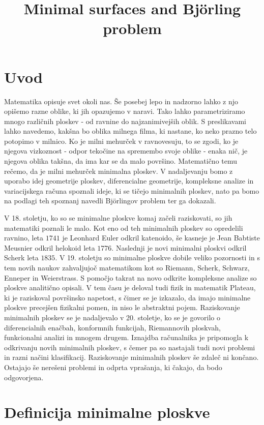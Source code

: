 \documentclass[mat1]{fmfdelo}
\title{Minimal surfaces and Björling problem}
\begin{document}
\section{Uvod}

Matematika opisuje svet okoli nas. Še posebej lepo in nadzorno lahko z njo opišemo razne oblike, ki jih 
opazujemo v naravi. Tako lahko parametriziramo mnogo različnih ploskev - od ravnine do najzanimivejših oblik.
S preslikavami lahko navedemo, kakšna bo oblika milnega filma, ki nastane, ko neko prazno telo potopimo v milnico.
Ko je milni mehurček v ravnovesuju, to se zgodi, ko je njegova vizkoznost - odpor tekočine na spremembo svoje 
oblike - enaka nič, je njegova oblika takšna, da ima kar se da malo površino. Matematično temu rečemo, da je milni 
mehurček minimalna ploskev. V nadaljevanju bomo z uporabo idej geometrije ploskev, diferencialne geometrije,
kompleksne analize in variacijskega računa spoznali ideje, ki se tičejo minimalnih ploskev, nato pa bomo na podlagi
teh spoznanj navedli Björlingov problem ter ga dokazali.

V 18. stoletju, ko so se minimalne ploskve komaj začeli raziskovati, so jih matematiki poznali le malo. Kot eno od teh 
minimalnih ploskev so opredelili ravnino, leta $1741$ je Leonhard Euler odkril katenoido, še kasneje je Jean Babtiste Meusnier
odkril helokoid leta $1776$. Naslednji je novi minimalni ploskvi odkril Scherk leta $1835$. 
V 19. stoletju so minimalne ploskve dobile veliko pozornosti in s tem novih naukov zahvaljujoč 
matematikom kot so Riemann, Scherk, Schwarz, Enneper in Weierstrass. S pomočjo takrat na novo odkrite kompleksne analize so 
ploskve analitično opisali. V tem času je deloval tudi fizik in matematik Plateau, ki je raziskoval površinsko napetost,
s čimer se je izkazalo, da imajo minimalne ploskve precejšen fizikalni pomen, in niso le abstraktni pojem. Raziskovanje 
minimalnih ploskev se je nadaljevalo v 20. stoletje, ko se je govorilo o diferencialnih enačbah, konformnih funkcijah, 
Riemannovih ploskvah, funkcionalni analizi in mnogem drugem. Iznajdba računalnika je pripomogla k odkrivanju novih minimalnih
ploskev, s čemer pa so nastajali tudi novi problemi in razni načini klasifikacij. Raziskovanje minimalnih ploskev še zdaleč ni 
končano. Ostajajo še nerešeni problemi in odprta vprašanja, ki čakajo, da bodo odgovorjena. 


\pagebreak

\section{Definicija minimalne ploskve}
\end{document}
